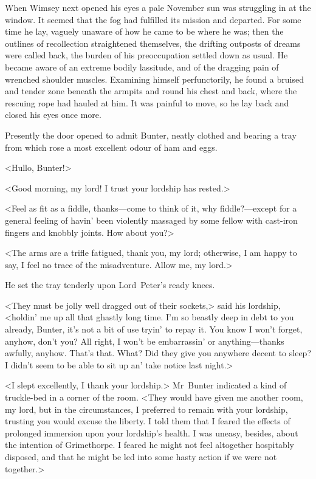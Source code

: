 \divider

When Wimsey next opened his eyes a pale November sun was struggling in at the window. It seemed that the fog had fulfilled its mission and departed. For some time he lay, vaguely unaware of how he came to be where he was; then the outlines of recollection straightened themselves, the drifting outposts of dreams were called back, the burden of his preoccupation settled down as usual. He became aware of an extreme bodily lassitude, and of the dragging pain of wrenched shoulder muscles. Examining himself perfunctorily, he found a bruised and tender zone beneath the armpits and round his chest and back, where the rescuing rope had hauled at him. It was painful to move, so he lay back and closed his eyes once more.

Presently the door opened to admit Bunter, neatly clothed and bearing a tray from which rose a most excellent odour of ham and eggs.

<Hullo, Bunter!>

<Good morning, my lord! I trust your lordship has rested.>

<Feel as fit as a fiddle, thanks—come to think of it, why fiddle?—except for a general feeling of havin' been violently massaged by some fellow with cast-iron fingers and knobbly joints. How about you?>

<The arms are a trifle fatigued, thank you, my lord; otherwise, I am happy to say, I feel no trace of the misadventure. Allow me, my lord.>

He set the tray tenderly upon Lord~Peter's ready knees.

<They must be jolly well dragged out of their sockets,> said his lordship, <holdin' me up all that ghastly long time. I'm so beastly deep in debt to you already, Bunter, it's not a bit of use tryin' to repay it. You know I won't forget, anyhow, don't you? All right, I won't be embarrassin' or anything—thanks awfully, anyhow. That's that.  What? Did they give you anywhere decent to sleep? I didn't seem to be able to sit up an' take notice last night.>

<I slept excellently, I thank your lordship.> Mr~Bunter indicated a kind of truckle-bed in a corner of the room. <They would have given me another room, my lord, but in the circumstances, I preferred to remain with your lordship, trusting you would excuse the liberty. I told them that I feared the effects of prolonged immersion upon your lordship's health. I was uneasy, besides, about the intention of Grimethorpe. I feared he might not feel altogether hospitably disposed, and that he might be led into some hasty action if we were not together.>

